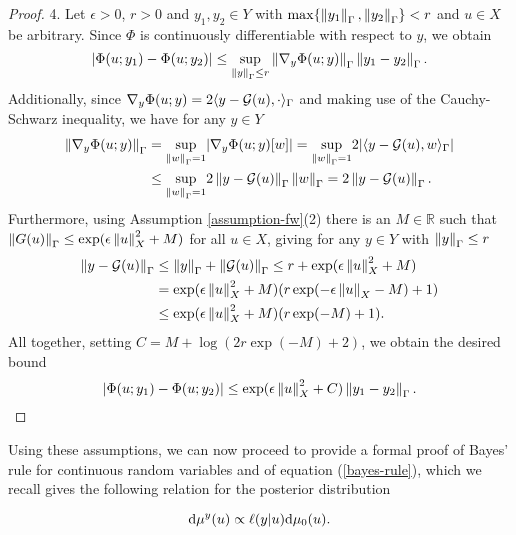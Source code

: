 \begin{proof}
  4. Let $\epsilon > 0$, $r > 0$ and $y_1, y_2 \in Y$ with $\max\{\left\lVert y_1\right\rVert_\Gamma, \left\lVert y_2\right\rVert_\Gamma\} < r$ and $u \in X$ be arbitrary. Since $\Phi$ is continuously differentiable with respect to $y$, we obtain
  \begin{equation*}
    |\Phi(u; y_1) - \Phi(u; y_2)|
    \le \underset{\left\lVert y\right\rVert_\Gamma \le r}{\sup}\left\lVert\nabla_y \Phi(u; y)\right\rVert_\Gamma\left\lVert y_1 - y_2\right\rVert_\Gamma.
  \end{equation*}
  Additionally, since $\nabla_y \Phi(u; y) = 2\langle y - \mathcal{G}(u), \cdot\rangle_\Gamma$ and making use of the Cauchy-Schwarz inequality, we have for any $y \in Y$
  \begin{align*}
    \left\lVert\nabla_y \Phi(u; y)\right\rVert_\Gamma
    &= \underset{\left\lVert w\right\rVert_\Gamma = 1}{\sup} |\nabla_y \Phi(u; y)[w]|
    = \underset{\left\lVert w\right\rVert_\Gamma = 1}{\sup} 2|\langle y - \mathcal{G}(u), w\rangle_\Gamma|
    \\ &\le \underset{\left\lVert w\right\rVert_\Gamma = 1}{\sup}2\left\lVert y - \mathcal{G}(u)\right\rVert_\Gamma\left\lVert w\right\rVert_\Gamma = 2\left\lVert y - \mathcal{G}(u)\right\rVert_\Gamma.
  \end{align*}
  Furthermore, using Assumption \ref{assumption-fw}(2) there is an $M \in \mathbb{R}$ such that $\left\lVert G(u)\right\rVert_\Gamma \le \exp(\epsilon \left\lVert u\right\rVert_X^2 + M)$ for all $u \in X$, giving for any $y \in Y$ with $\left\lVert y\right\rVert_\Gamma \le r$
  \begin{align*}
    \left\lVert y - \mathcal{G}(u)\right\rVert_\Gamma
    &\le \left\lVert y\right\rVert_\Gamma + \left\lVert\mathcal{G}(u)\right\rVert_\Gamma
    \le r + \exp(\epsilon\left\lVert u\right\rVert_X^2 + M)\\
    &= \exp(\epsilon\left\lVert u\right\rVert_X^2 + M)(r \exp(-\epsilon\left\lVert u\right\rVert_X - M) + 1)\\
    &\le \exp(\epsilon\left\lVert u\right\rVert_X^2 + M)(r \exp(-M) + 1).
  \end{align*}
  All together, setting $C = M + \log(2r \exp(-M) + 2)$, we obtain the desired bound
  \begin{equation*}
    |\Phi(u; y_1) - \Phi(u; y_2)| \le \exp(\epsilon \left\lVert u\right\rVert_X^2 + C)\left\lVert y_1 - y_2\right\rVert_\Gamma.
  \end{equation*}
\end{proof}

Using these assumptions, we can now proceed to provide a formal proof of Bayes' rule for continuous random variables and of equation (\ref{bayes-rule}), which we recall gives the following relation for the posterior distribution

\begin{equation*}
  \text{d}\mu^y(u) \propto \ell(y|u)\text{d}\mu_0(u).
\end{equation*}

